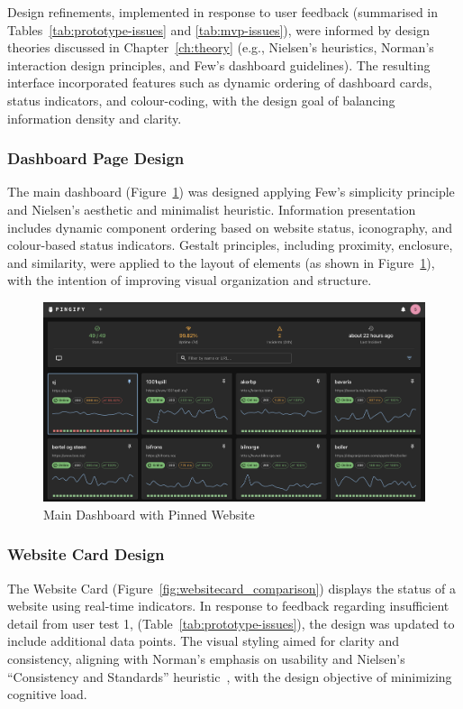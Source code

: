 Design refinements, implemented in response to user feedback (summarised in Tables~\ref{tab:prototype-issues} and \ref{tab:mvp-issues}), were informed by design theories discussed in Chapter~\ref{ch:theory} (e.g., Nielsen’s heuristics, Norman’s interaction design principles, and Few’s dashboard guidelines). The resulting interface incorporated features such as dynamic ordering of dashboard cards, status indicators, and colour-coding, with the design goal of balancing information density and clarity.

\subsubsection{Dashboard Page Design}
The main dashboard (Figure~\ref{fig:main_dashboard}) was designed applying Few’s simplicity principle and Nielsen’s aesthetic and minimalist heuristic. Information presentation includes dynamic component ordering based on website status, iconography, and colour-based status indicators. Gestalt principles, including proximity, enclosure, and similarity, were applied to the layout of elements (as shown in Figure~\ref{fig:main_dashboard}), with the intention of improving visual organization and structure.

\begin{figure}[H]
    \centering
    \includegraphics[width=1\linewidth]{figures/main_dashboard.png}
    \caption{Main Dashboard with Pinned Website}
    \label{fig:main_dashboard}
\end{figure}

\subsubsection{Website Card Design}
The Website Card (Figure~\ref{fig:websitecard_comparison}) displays the status of a website using real-time indicators. In response to feedback regarding insufficient detail from user test 1, (Table~\ref{tab:prototype-issues}), the design was updated to include additional data points. The visual styling aimed for clarity and consistency, aligning with Norman’s emphasis on usability and Nielsen’s “Consistency and Standards” heuristic~\autocite{Nielsen1994}, with the design objective of minimizing cognitive load.


